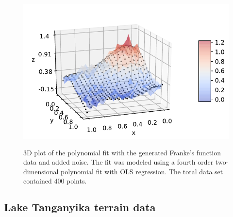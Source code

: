 \documentclass[a4paper, 10pt]{article}
\begin{document}
\begin{figure}[H]
	\includegraphics[scale=1]{figs/3dmodel_OLS_Franke.pdf}
	\label{fig:3d_OLS_Franke}
	\caption{3D plot of the polynomial fit with the generated Franke's function data and added noise. The fit was modeled using a fourth order two-dimensional polynomial fit with OLS regression. The total data set contained 400 points.}
\end{figure}




\subsection{Lake Tanganyika terrain data}
\end{document}
